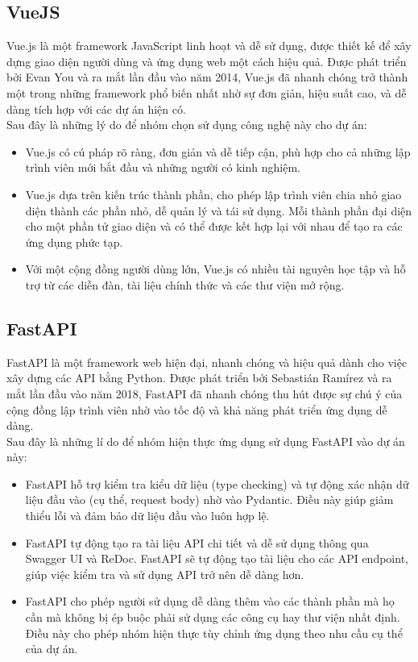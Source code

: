 \subsection{VueJS}
Vue.js là một framework JavaScript linh hoạt và dễ sử dụng, được thiết kế để xây dựng giao diện người dùng và ứng dụng web một cách hiệu quả. Được phát triển bởi Evan You và ra mắt lần đầu vào năm 2014, Vue.js đã nhanh chóng trở thành một trong những framework phổ biến nhất nhờ sự đơn giản, hiệu suất cao, và dễ dàng tích hợp với các dự án hiện có.\\
Sau đây là những lý do để nhóm chọn sử dụng công nghệ này cho dự án:
\begin{itemize}
    \item Vue.js có cú pháp rõ ràng, đơn giản và dễ tiếp cận, phù hợp cho cả những lập trình viên mới bắt đầu và những người có kinh nghiệm.
    \item Vue.js dựa trên kiến trúc thành phần, cho phép lập trình viên chia nhỏ giao diện thành các phần nhỏ, dễ quản lý và tái sử dụng. Mỗi thành phần đại diện cho một phần tử giao diện và có thể được kết hợp lại với nhau để tạo ra các ứng dụng phức tạp.
    \item Với một cộng đồng người dùng lớn, Vue.js có nhiều tài nguyên học tập và hỗ trợ từ các diễn đàn, tài liệu chính thức và các thư viện mở rộng.
\end{itemize}
\subsection{FastAPI}
FastAPI là một framework web hiện đại, nhanh chóng và hiệu quả dành cho việc xây dựng các API bằng Python. Được phát triển bởi Sebastián Ramírez và ra mắt lần đầu vào năm 2018, FastAPI đã nhanh chóng thu hút được sự chú ý của cộng đồng lập trình viên nhờ vào tốc độ và khả năng phát triển ứng dụng dễ dàng.\\
Sau đây là những lí do để nhóm hiện thực ứng dụng sử dụng FastAPI vào dự án này:
\begin{itemize}
    \item FastAPI hỗ trợ kiểm tra kiểu dữ liệu (type checking) và tự động xác nhận dữ liệu đầu vào (cụ thể, request body) nhờ vào Pydantic. Điều này giúp giảm thiểu lỗi và đảm bảo dữ liệu đầu vào luôn hợp lệ.
    \item FastAPI tự động tạo ra tài liệu API chi tiết và dễ sử dụng thông qua Swagger UI và ReDoc. FastAPI sẽ tự động tạo tài liệu cho các API endpoint, giúp việc kiểm tra và sử dụng API trở nên dễ dàng hơn.
    \item FastAPI cho phép người sử dụng dễ dàng thêm vào các thành phần mà họ cần mà không bị ép buộc phải sử dụng các công cụ hay thư viện nhất định. Điều này cho phép nhóm hiện thực tùy chỉnh ứng dụng theo nhu cầu cụ thể của dự án.
\end{itemize}

